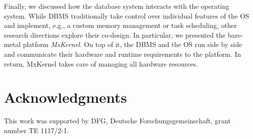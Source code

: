 \documentclass[11pt]{article}
\begin{document}
Finally, we discussed how the database system interacts with the operating system.
While DBMS traditionally take control over individual features of the OS and implement, e.g., a custom memory management or task scheduling, other research directions explore their co-design.
In particular, we presented the bare-metal platform \emph{MxKernel}.
On top of it, the DBMS and the OS run side by side and communicate their hardware and runtime requirements to the platform.
In return, MxKernel takes care of managing all hardware resources.

\section*{Acknowledgments}
This work was supported by DFG, Deutsche Forschungsgemeinschaft, grant number TE 1117/2-1.
\end{document}
